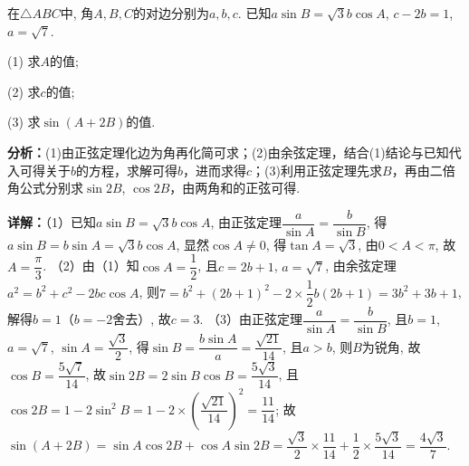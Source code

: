 \begin{question}[points=15]
在$\triangle ABC$中, 角$A, B, C$的对边分别为$a, b, c$. 已知$a\sin B = \sqrt{3}b\cos A$, $c - 2b = 1$, $a = \sqrt{7}$.

(1) 求$A$的值;

(2) 求$c$的值;

(3) 求$\sin(A + 2B)$的值.
\begin{solution}

\textbf{分析：}(1)由正弦定理化边为角再化简可求；(2)由余弦定理，结合(1)结论与已知代入可得关于$b$的方程，求解可得$b$，进而求得$c$；(3)利用正弦定理先求$B$，再由二倍角公式分别求$\sin 2B$, $\cos 2B$，由两角和的正弦可得.

\textbf{详解：}（1）已知$a\sin B = \sqrt{3}b\cos A$, 由正弦定理$\dfrac{a}{\sin A} = \dfrac{b}{\sin B}$, 得$a\sin B = b\sin A = \sqrt{3}b\cos A$, 显然$\cos A \neq 0$, 得$\tan A = \sqrt{3}$, 由$0 < A < \pi$, 故$A = \dfrac{\pi}{3}$.
（2）由（1）知$\cos A = \dfrac{1}{2}$, 且$c = 2b + 1$, $a = \sqrt{7}$, 由余弦定理$a^2 = b^2 + c^2 - 2bc\cos A$, 则$7 = b^2 + (2b+1)^2 - 2 \times \dfrac{1}{2} b(2b+1) = 3b^2 + 3b + 1$, 解得$b = 1$（$b = -2$舍去）, 故$c = 3$.
（3）由正弦定理$\dfrac{a}{\sin A} = \dfrac{b}{\sin B}$, 且$b = 1$, $a = \sqrt{7}$, $\sin A = \dfrac{\sqrt{3}}{2}$, 得$\sin B = \dfrac{b\sin A}{a} = \dfrac{\sqrt{21}}{14}$, 且$a > b$, 则$B$为锐角, 故$\cos B = \dfrac{5\sqrt{7}}{14}$, 故$\sin 2B = 2\sin B\cos B = \dfrac{5\sqrt{3}}{14}$, 且$\cos 2B = 1 - 2\sin^2 B = 1 - 2 \times \left(\dfrac{\sqrt{21}}{14}\right)^2 = \dfrac{11}{14}$; 故$\sin(A + 2B) = \sin A \cos 2B + \cos A \sin 2B = \dfrac{\sqrt{3}}{2} \times \dfrac{11}{14} + \dfrac{1}{2} \times \dfrac{5\sqrt{3}}{14} = \dfrac{4\sqrt{3}}{7}$.
\end{solution}
\end{question}

